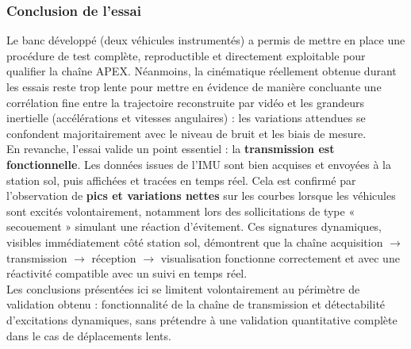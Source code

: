 \subsubsection{Conclusion de l’essai}

Le banc développé (deux véhicules instrumentés) a permis de mettre en place une procédure de test complète, reproductible et
directement exploitable pour qualifier la chaîne APEX. Néanmoins, la cinématique réellement obtenue durant les essais reste
trop lente pour mettre en évidence de manière concluante une corrélation fine entre la trajectoire reconstruite par vidéo et les
grandeurs inertielle (accélérations et vitesses angulaires) : les variations attendues se confondent majoritairement avec le
niveau de bruit et les biais de mesure.\\

En revanche, l’essai valide un point essentiel : la \textbf{transmission est fonctionnelle}. Les données issues de
l’\acrshort{IMU} sont bien acquises et envoyées à la station sol, puis affichées et tracées en temps réel. Cela est confirmé par
l’observation de \textbf{pics et variations nettes} sur les courbes lorsque les véhicules sont excités volontairement, notamment
lors des sollicitations de type « secouement » simulant une réaction d’évitement. Ces signatures dynamiques, visibles
immédiatement côté station sol, démontrent que la chaîne acquisition $\rightarrow$ transmission $\rightarrow$ réception
$\rightarrow$ visualisation fonctionne correctement et avec une réactivité compatible avec un suivi en temps réel.\\

Les conclusions présentées ici se limitent volontairement au périmètre de validation obtenu : fonctionnalité de la
chaîne de transmission et détectabilité d’excitations dynamiques, sans prétendre à une validation quantitative complète dans le
cas de déplacements lents.

\newpage
